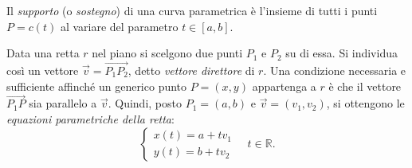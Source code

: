 \documentclass[11pt,a4paper]{article}
\begin{document}
\begin{definizione}
Il \emph{supporto} (o \emph{sostegno}) di una curva parametrica è l'insieme di tutti i punti $P = c(t)$ al variare del parametro $t \in [a, b]$.
\end{definizione}

\begin{esempio}
Data una retta $r$ nel piano si scelgono due punti $P_1$ e $P_2$ su di essa. Si individua così un vettore $\vec v = \overrightarrow{P_1P_2}$, detto \emph{vettore direttore} di $r$. Una condizione necessaria e sufficiente affinché un generico punto $P = (x, y)$ appartenga a $r$ è che il vettore $\overrightarrow{P_1P}$ sia parallelo a $\vec v$. Quindi, posto $P_1 = (a, b)$ e $\vec v = (v_1, v_2)$, si ottengono le \emph{equazioni parametriche della retta}:
\[
\begin{cases} x(t) = a + t v_1 \\ y(t) = b + t v_2 \end{cases} \quad t \in \mathbb{R}.
\]
\end{esempio}
\end{document}
